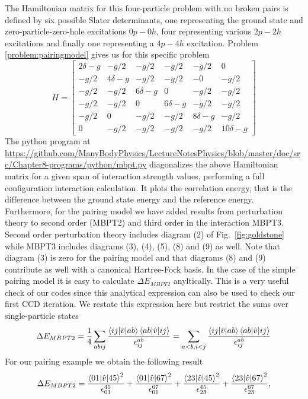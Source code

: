 The Hamiltonian matrix for this   four-particle problem with no broken pairs is defined by six possible Slater determinants,
one representing the ground state and zero-particle-zero-hole excitations $0p-0h$, four representing various $2p-2h$ excitations and finally one representing a $4p-4h$ excitation. Problem \ref{problem:pairingmodel} gives us for this specific problem
  \[
  H = \begin{bmatrix}
  2\delta -g & -g/2 & -g/2 & -g/2 & -g/2 & 0 \\ -g/2 & 4\delta -g &
  -g/2 & -g/2 & -0 & -g/2 \\ -g/2 & -g/2 & 6\delta -g & 0 & -g/2 &
  -g/2 \\ -g/2 & -g/2 & 0 & 6\delta-g & -g/2 & -g/2 \\ -g/2 & 0 & -g/2
  & -g/2 & 8\delta-g & -g/2 \\ 0 & -g/2 & -g/2 & -g/2 & -g/2 &
  10\delta -g
  \end{bmatrix}
  \]
  The python program at \url{https://github.com/ManyBodyPhysics/LectureNotesPhysics/blob/master/doc/src/Chapter8-programs/python/mbpt.py} diagonalizes the above Hamiltonian
  matrix for a given span of interaction strength values, performing
  a full configuration interaction calculation. It plots the correlation energy, that is the difference between the ground state energy and the reference energy. Furthermore, for the pairing model we have added results from perturbation theory to second order (MBPT2)
and third order in the interaction MBPT3. Second order perturbation theory includes diagram (2) of Fig.~\ref{fig:goldstone}
while MBPT3 includes diagrams (3), (4), (5), (8) and (9) as well. Note that diagram (3) is zero for the pairing model and that diagrams (8) and (9) contribute as well with a canonical Hartree-Fock basis. 
  In the case of the simple pairing model it is easy to calculate
  $\Delta E_{MBPT2}$ anyltically. This is a very useful  check of our codes since this analytical expression  can  also be used to check our first CCD iteration.
We restate this expression here but restrict the sums over single-particle states
  \[
  \Delta E_{MBPT2} = \frac{1}{4} \sum_{abij} \frac{\braket{ij|\hat{v}|ab}
    \braket{ab|\hat{v}|ij}}{ \epsilon_{ij}^{ab}} = \sum_{a<b,i<j}
  \frac{\braket{ij|\hat{v}|ab} \braket{ab|\hat{v}|ij}}{ \epsilon_{ij}^{ab}}
  \]
  For our pairing example we obtain the following result
  \[
  \Delta E_{MBPT2} = \frac{\braket{01|\hat{v}|45}^2}{\epsilon_{01}^{45}} +
  \frac{\braket{01|\hat{v}|67}^2}{\epsilon_{01}^{67}} +
  \frac{\braket{23|\hat{v}|45}^2}{\epsilon_{23}^{45}} +
  \frac{\braket{23|\hat{v}|67}^2}{\epsilon_{23}^{67}},
  \]
